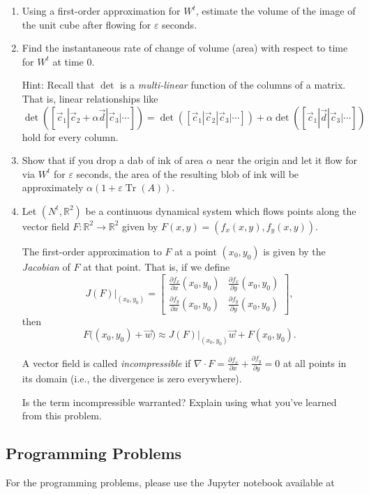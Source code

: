 \documentclass[letter]{article}
\newcommand{\R}{\mathbb{R}}
\newcommand{\mat}[1]{\begin{bmatrix}#1\end{bmatrix}}
\DeclareMathOperator{\Tr}{Tr}
\begin{document}
\begin{enumerate}
\begin{enumerate}
				\item Using a first-order approximation for $W^t$, estimate the volume of the image of the unit cube
					after flowing for $\varepsilon$ seconds.

				\item Find the instantaneous rate of change of volume (area) with respect to time for $W^t$ at time $0$.

					Hint: Recall that $\det$ is a \emph{multi-linear} function of the columns of a matrix. 
					That is, linear relationships like $\det([\vec c_1|\vec c_2+\alpha \vec d|\vec c_3|\cdots])
					=\det([\vec c_1|\vec c_2|\vec c_3|\cdots])
					+\alpha\det([\vec c_1|\vec d|\vec c_3|\cdots])$ hold for every column.

				\item Show that if you drop a dab of ink of area $\alpha$ near the origin and let it flow for via $W^t$
					for $\varepsilon$ seconds,
					the area of the resulting blob of ink will be approximately $\alpha(1+\varepsilon\Tr(A))$.
				\item Let $(N^t, \R^2)$ be a continuous dynamical system which flows points along the vector field
					$F:\R^2\to\R^2$ given by $F(x,y) = (f_x(x,y), f_y(x,y))$. 

					The first-order approximation to $F$ at a point $(x_0,y_0)$ is given by the \emph{Jacobian}
					of $F$ at that point. That is, if we define
					\[
						J(F)\big|_{(x_0,y_0)} = \mat{
							\frac{\partial f_x}{\partial x}(x_0,y_0) & \frac{\partial f_x}{\partial y}(x_0,y_0)\\[2pt]
							\frac{\partial f_y}{\partial x}(x_0,y_0) & \frac{\partial f_y}{\partial y}(x_0,y_0)
						},
					\]
					then 
					\[
						F\big((x_0,y_0) + \vec w\big) \approx J(F)\big|_{(x_0,y_0)}\vec w + F(x_0,y_0).
					\]

					A vector field is called \emph{incompressible} if $\nabla \cdot F = \frac{\partial f_x}{\partial x} + 
					\frac{\partial f_y}{\partial y}=0$ at all points in its domain (i.e., the divergence is zero everywhere).

					Is the term incompressible warranted? Explain using what you've learned from this problem.
			\end{enumerate}


	\end{enumerate}


	\subsection*{Programming Problems}
	For the programming problems, please use the Jupyter notebook available at
\end{document}
